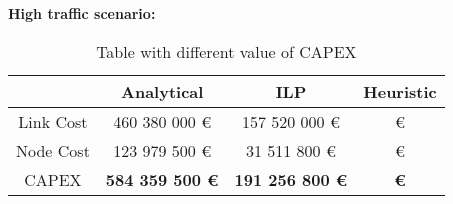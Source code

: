 \vspace{11pt}
\textbf{High traffic scenario:}\\

\begin{table}[h!]
\centering
\begin{tabular}{| c | c | c | c |}
 \hline
   & Analytical & ILP & Heuristic \\
 \hline\hline
 Link Cost & 460 380 000 \euro & 157 520 000 \euro &  \euro \\
 Node Cost & 123 979 500 \euro & 31 511 800 \euro &  \euro \\
 CAPEX & \textbf{584 359 500 \euro} & \textbf{191 256 800 \euro} & \textbf{ \euro} \\
 \hline
\end{tabular}
\caption{Table with different value of CAPEX }
\label{table_comparative_transp_sur_ref_3}
\end{table}

